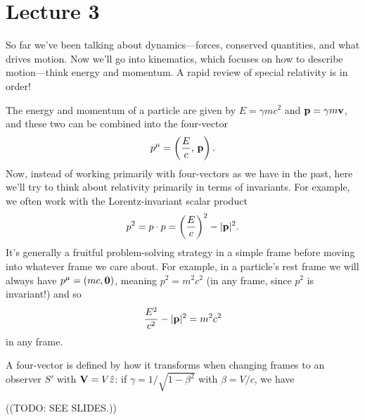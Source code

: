 \documentclass[../p164main.tex]{subfiles}
\begin{document}




\bigskip
\bigskip
\bigskip
\bigskip
\bigskip

\section{Lecture 3}
So far we've been talking about dynamics---forces, conserved quantities, and what drives motion.
Now we'll go into kinematics, which focuses on how to describe motion---think energy and momentum.
A rapid review of special relativity is in order!

The energy and momentum of a particle are given by $E = \gamma mc^2$ and $\mathbf{p} = \gamma m\mathbf{v}$, and these two can be combined into the four-vector
\[ p^\mu = \left( \frac{E}{c}, \, \mathbf{p} \right). \]
Now, instead of working primarily with four-vectors as we have in the past, here we'll try to think about relativity primarily in terms of invariants.
For example, we often work with the Lorentz-invariant scalar product
\[ p^2  = p \cdot p = \left( \frac{E}{c} \right)^2 - |\mathbf{p}|^2. \]
It's generally a fruitful problem-solving strategy in a simple frame before moving into whatever frame we care about.
For example, in a particle's rest frame we will always have $p^\mu = (mc, \mathbf{0})$, meaning $p^2 = m^2c^2$ (in any frame, since $p^2$ is invariant!) and so
\[ \frac{E^2}{c^2} - |\mathbf{p}|^2 = m^2c^2 \]
in any frame.

A four-vector is defined by how it transforms when changing frames to an observer $S'$ with $\mathbf{V} = V \hat z$: if $\gamma = 1 / \sqrt{1 - \beta^2}$ with $\beta = V / c$, we have

\begin{center}
    ((TODO: SEE SLIDES.))
\end{center}
\end{document}
